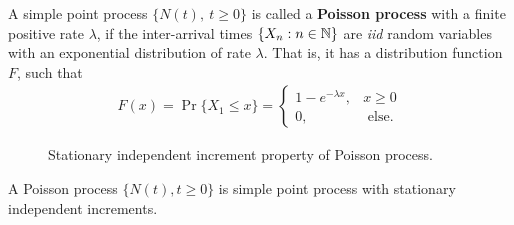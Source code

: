 \documentclass[a4paper,10pt,english]{article}
\begin{document}
A simple point process $\{N(t),~ t\geqslant 0\} $ is called a \textbf{Poisson process} with a finite positive rate $\lambda$, 
if the inter-arrival times $\{X_{n}: n \in \mathbb{N}\}$ are \emph{iid} random variables with an exponential distribution of rate $\lambda$. 
That is, it has a distribution function $F$, such that 
 \begin{align*}
 F(x) = \Pr\{X_{1}\leqslant x\} = 
	\begin{cases}
		1-e^{-\lambda x}, & x\geqslant 0   \\
		0,  & \text{ else}.
	\end{cases}
\end{align*}

\begin{figure}[hhhh]
\center
	
  	\caption{Stationary independent increment property of Poisson process.}
	\label{Fig:IndependentIncrements}
\end{figure}
\begin{prop} A Poisson process $\{N(t), t\geqslant 0\}$ is simple point process with stationary independent increments.
\end{prop}
\end{document}
